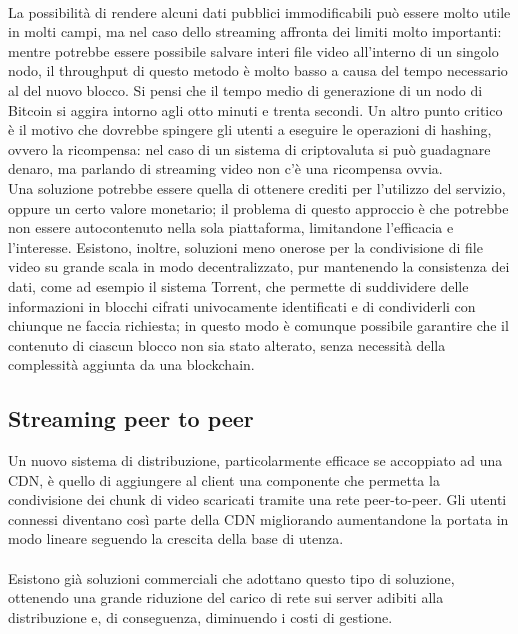 	\paragraph*{}
	La possibilità di rendere alcuni dati pubblici immodificabili può essere molto utile in molti campi, ma nel caso dello streaming affronta dei limiti molto importanti: mentre potrebbe essere possibile salvare interi file video all'interno di un singolo nodo, il throughput di questo metodo è molto basso a causa del tempo necessario al  del nuovo blocco. Si pensi che il tempo medio di generazione di un nodo di Bitcoin si aggira intorno agli otto minuti e trenta secondi. Un altro punto critico è il motivo che dovrebbe spingere gli utenti a eseguire le operazioni di hashing, ovvero la ricompensa: nel caso di un sistema di criptovaluta si può guadagnare denaro, ma parlando di streaming video non c'è una ricompensa ovvia.
	\\
	Una soluzione potrebbe essere quella di ottenere crediti per l'utilizzo del servizio, oppure un certo valore monetario; il problema di questo approccio è che potrebbe non essere autocontenuto nella sola piattaforma, limitandone l'efficacia e l'interesse. Esistono, inoltre, soluzioni meno onerose per la condivisione di file video su grande scala in modo decentralizzato, pur mantenendo la consistenza dei dati, come ad esempio il sistema Torrent, che permette di suddividere delle informazioni in blocchi cifrati univocamente identificati e di condividerli con chiunque ne faccia richiesta; in questo modo è comunque possibile garantire che il contenuto di ciascun blocco non sia stato alterato, senza necessità della complessità aggiunta da una blockchain.

	\subsection{Streaming peer to peer}
	Un nuovo sistema di distribuzione, particolarmente efficace se accoppiato ad una \gls{CDN}, è quello di aggiungere al client una componente che permetta la condivisione dei chunk di video scaricati tramite una rete peer-to-peer. Gli utenti connessi diventano così parte della \gls{CDN} migliorando aumentandone la portata in modo lineare seguendo la crescita della base di utenza.
	\paragraph*{}
	Esistono già soluzioni commerciali che adottano questo tipo di soluzione, ottenendo una grande riduzione del carico di rete sui server adibiti alla distribuzione e, di conseguenza, diminuendo i costi di gestione.
